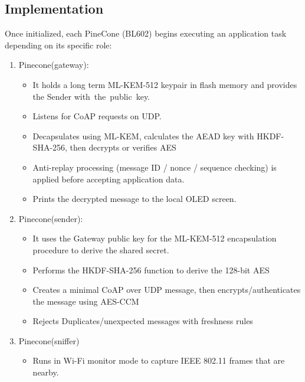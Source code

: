 \documentclass[USenglish,oneside,twocolumn]{article}
\begin{document}
    \subsection{Implementation}
    Once initialized, each PineCone (BL602) begins executing an application task depending on its specific role:
    \begin{enumerate}
    
    \item Pinecone(gateway):
    
    \begin{itemize}
    \item It holds a long term ML-KEM-512 keypair in flash memory and provides the Sender with the public key.
    \item Listens for CoAP requests on UDP.
    \item Decapsulates using ML-KEM, calculates the AEAD key with HKDF-SHA-256, then decrypts or verifies AES
    \item Anti-replay processing (message ID / nonce / sequence checking) is applied before accepting application data.
    \item Prints the decrypted message to the local OLED screen.
    \end{itemize}

    \item Pinecone(sender):

    \begin{itemize}
        \item It uses the Gateway public key for the ML-KEM-512 encapsulation procedure to derive the shared secret.

        \item Performs the HKDF-SHA-256 function to derive the 128-bit AES

        \item Creates a minimal CoAP over UDP message, then encrypts/authenticates the message using AES-CCM

        \item Rejects Duplicates/unexpected messages with freshness rules

    \end{itemize}

    \item Pinecone(sniffer)

    \begin{itemize}
        \item Runs in Wi-Fi monitor mode to capture IEEE 802.11 frames that are nearby.
        

\end{itemize}
\end{enumerate}
\end{document}
